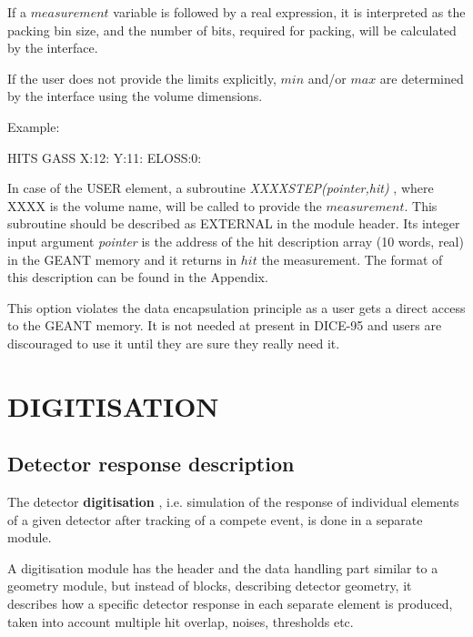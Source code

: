  If a  $measurement$ variable is followed by a real expression,
it is interpreted as the packing bin size, and the number of bits,
required for packing, will be calculated by the \as interface. 

If the user does not provide the limits explicitly, $min$ and/or $max$ 
are determined  by the \as interface using  the volume dimensions.

\vspace{0.3cm}  Example: 
\begin{center}  HITS  GASS   X:12: Y:11: ELOSS:0:  \end{center}
 
In case of the USER element, a subroutine {\it XXXXSTEP(pointer,hit) }, 
where XXXX is the volume name, will be called to provide the $measurement$.
This subroutine should be described as EXTERNAL in the module header.
Its integer input argument {\it pointer} is the address
of the hit description array (10 words, real) in the GEANT memory
and it returns in $hit$ the measurement.
The format of this description can be found in the Appendix.

This option violates the data encapsulation principle as
a user gets a direct access to the GEANT memory.
It is not needed at present in DICE-95 and
users are discouraged to use it until they are sure they really need it.


\section{DIGITISATION}

\subsection{Detector response description}

The detector {\bf digitisation }, i.e.
simulation of the response of individual elements of a 
given detector after tracking of a compete event, 
is done in a separate \g module. 

A digitisation module has the  header 
and the data handling part similar to a  geometry module,
but instead of  blocks, describing detector geometry,
it describes how a specific detector response 
in each separate element is produced, 
taken into account multiple hit overlap,
noises, thresholds etc.

